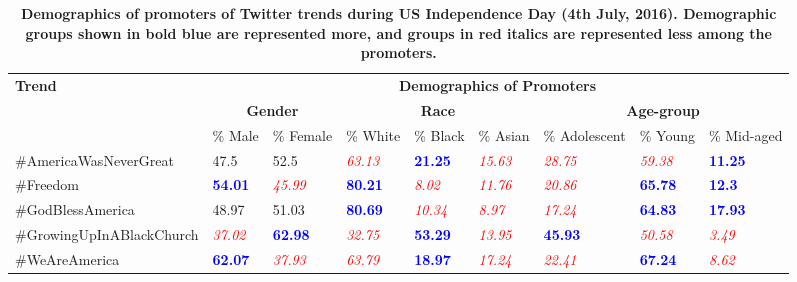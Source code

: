\documentclass[letterpaper]{article}
\begin{document}
\begin{table*}[t]
\center
\small
\begin{tabular}{|p{}|p{}|p{}||p{}|p{}|p{}||p{}|p{}|p{}|}
\hline
\multirow{3}{*}{\bf Trend} & \multicolumn{8}{c|}{\bf Demographics of Promoters} \\
\cline{2-9}
~ & \multicolumn{2}{c||}{\bf Gender}  & \multicolumn{3}{c||}{\bf Race} & \multicolumn{3}{c|}{\bf Age-group} \\
\cline{2-9}
~ & \% Male & \% Female & \% White & \% Black & \% Asian & \% Adolescent & \% Young & \% Mid-aged \\
\hline
\#AmericaWasNeverGreat & 47.5 & 52.5 &  \textcolor{red}{\it 63.13} & \textcolor{blue}{\bf 21.25} & \textcolor{red}{\it 15.63} &  \textcolor{red}{\it 28.75} & \textcolor{red}{\it 59.38} & \textcolor{blue}{\bf 11.25}  \\
\hline
\#Freedom & \textcolor{blue}{\bf 54.01} & \textcolor{red}{\it 45.99} &  \textcolor{blue}{\bf 80.21} & \textcolor{red}{\it 8.02} & \textcolor{red}{\it 11.76} &  \textcolor{red}{\it 20.86} & \textcolor{blue}{\bf 65.78} & \textcolor{blue}{\bf 12.3}  \\
\hline
\#GodBlessAmerica & 48.97 & 51.03 &  \textcolor{blue}{\bf 80.69} & \textcolor{red}{\it 10.34} & \textcolor{red}{\it 8.97} &  \textcolor{red}{\it 17.24} & \textcolor{blue}{\bf 64.83} & \textcolor{blue}{\bf 17.93}  \\
\hline
\#GrowingUpInABlackChurch & \textcolor{red}{\it 37.02} & \textcolor{blue}{\bf 62.98} &  \textcolor{red}{\it 32.75} & \textcolor{blue}{\bf 53.29} & \textcolor{red}{\it 13.95} &  \textcolor{blue}{\bf 45.93} & \textcolor{red}{\it 50.58} & \textcolor{red}{\it 3.49}  \\
\hline
\#WeAreAmerica & \textcolor{blue}{\bf 62.07} & \textcolor{red}{\it 37.93} &  \textcolor{red}{\it 63.79} & \textcolor{blue}{\bf 18.97} & \textcolor{red}{\it 17.24} &  \textcolor{red}{\it 22.41} & \textcolor{blue}{\bf 67.24} & \textcolor{red}{\it 8.62}  \\
\hline
\end{tabular}
\vspace*{-2mm}
\caption{{\bf Demographics of promoters of Twitter trends during US Independence Day (4th July, 2016). Demographic groups shown in bold blue are represented more, and groups in red italics are represented less among the promoters.}}
\label{tab:independence_day}
\vspace*{-4mm}
\end{table*}
\end{document}
